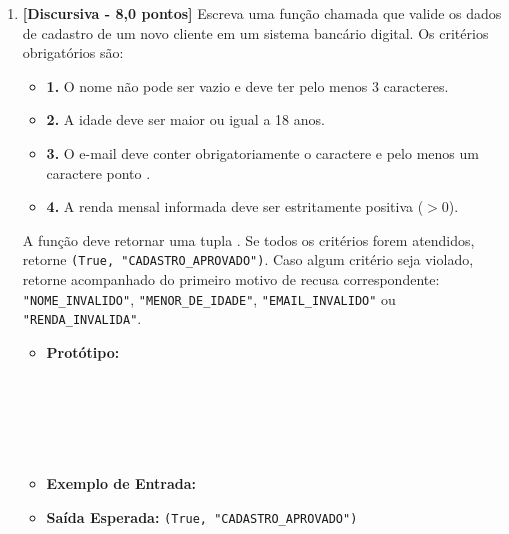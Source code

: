 \begin{enumerate}[label=\textbf{Q\arabic*.}, start=1]


\vspace{0.5cm}

\item \textbf{[Discursiva - 8,0 pontos]} Escreva uma função chamada  que valide os dados de cadastro de um novo cliente em um sistema bancário digital. Os critérios obrigatórios são:
\begin{itemize}[leftmargin=*]
    \item \textbf{1.} O nome não pode ser vazio e deve ter pelo menos 3 caracteres.
    \item \textbf{2.} A idade deve ser maior ou igual a 18 anos.
    \item \textbf{3.} O e-mail deve conter obrigatoriamente o caractere  e pelo menos um caractere ponto .
    \item \textbf{4.} A renda mensal informada deve ser estritamente positiva ($> 0$).
\end{itemize}
A função deve retornar uma tupla . Se todos os critérios forem atendidos, retorne \texttt{(True, "CADASTRO\_APROVADO")}. Caso algum critério seja violado, retorne  acompanhado do primeiro motivo de recusa correspondente: \texttt{"NOME\_INVALIDO"}, \texttt{"MENOR\_DE\_IDADE"}, \texttt{"EMAIL\_INVALIDO"} ou \texttt{"RENDA\_INVALIDA"}.

\begin{itemize}[leftmargin=*]
    \item \textbf{Protótipo:}\newline {}\\\\\\\\\\\\
    \item \textbf{Exemplo de Entrada:} 
    \item \textbf{Saída Esperada:} \texttt{(True, "CADASTRO\_APROVADO")}
\end{itemize}



\vspace{0.5cm}


\end{enumerate}
